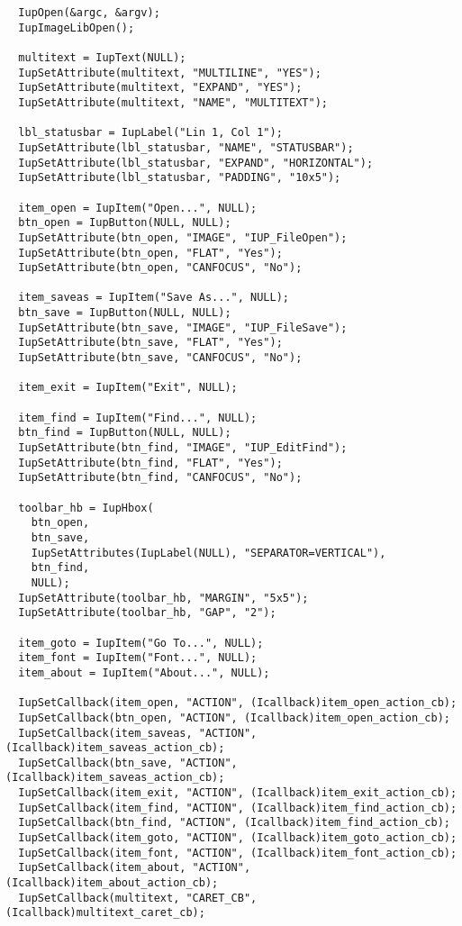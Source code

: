\documentclass{ctexart}
\begin{document}
\begin{lstlisting}
  IupOpen(&argc, &argv);
  IupImageLibOpen();

  multitext = IupText(NULL);
  IupSetAttribute(multitext, "MULTILINE", "YES");
  IupSetAttribute(multitext, "EXPAND", "YES");
  IupSetAttribute(multitext, "NAME", "MULTITEXT");

  lbl_statusbar = IupLabel("Lin 1, Col 1");
  IupSetAttribute(lbl_statusbar, "NAME", "STATUSBAR");  
  IupSetAttribute(lbl_statusbar, "EXPAND", "HORIZONTAL");
  IupSetAttribute(lbl_statusbar, "PADDING", "10x5");

  item_open = IupItem("Open...", NULL);
  btn_open = IupButton(NULL, NULL);
  IupSetAttribute(btn_open, "IMAGE", "IUP_FileOpen");
  IupSetAttribute(btn_open, "FLAT", "Yes");
  IupSetAttribute(btn_open, "CANFOCUS", "No");

  item_saveas = IupItem("Save As...", NULL);
  btn_save = IupButton(NULL, NULL);
  IupSetAttribute(btn_save, "IMAGE", "IUP_FileSave");
  IupSetAttribute(btn_save, "FLAT", "Yes");
  IupSetAttribute(btn_save, "CANFOCUS", "No");

  item_exit = IupItem("Exit", NULL);

  item_find = IupItem("Find...", NULL);
  btn_find = IupButton(NULL, NULL);
  IupSetAttribute(btn_find, "IMAGE", "IUP_EditFind");
  IupSetAttribute(btn_find, "FLAT", "Yes");
  IupSetAttribute(btn_find, "CANFOCUS", "No");

  toolbar_hb = IupHbox(
    btn_open,
    btn_save,
    IupSetAttributes(IupLabel(NULL), "SEPARATOR=VERTICAL"),
    btn_find,
    NULL);
  IupSetAttribute(toolbar_hb, "MARGIN", "5x5");
  IupSetAttribute(toolbar_hb, "GAP", "2");

  item_goto = IupItem("Go To...", NULL);
  item_font = IupItem("Font...", NULL);
  item_about = IupItem("About...", NULL);

  IupSetCallback(item_open, "ACTION", (Icallback)item_open_action_cb);
  IupSetCallback(btn_open, "ACTION", (Icallback)item_open_action_cb);
  IupSetCallback(item_saveas, "ACTION", (Icallback)item_saveas_action_cb);
  IupSetCallback(btn_save, "ACTION", (Icallback)item_saveas_action_cb);
  IupSetCallback(item_exit, "ACTION", (Icallback)item_exit_action_cb);
  IupSetCallback(item_find, "ACTION", (Icallback)item_find_action_cb);
  IupSetCallback(btn_find, "ACTION", (Icallback)item_find_action_cb);  
  IupSetCallback(item_goto, "ACTION", (Icallback)item_goto_action_cb);
  IupSetCallback(item_font, "ACTION", (Icallback)item_font_action_cb);
  IupSetCallback(item_about, "ACTION", (Icallback)item_about_action_cb);
  IupSetCallback(multitext, "CARET_CB", (Icallback)multitext_caret_cb);


\end{lstlisting}
\end{document}
